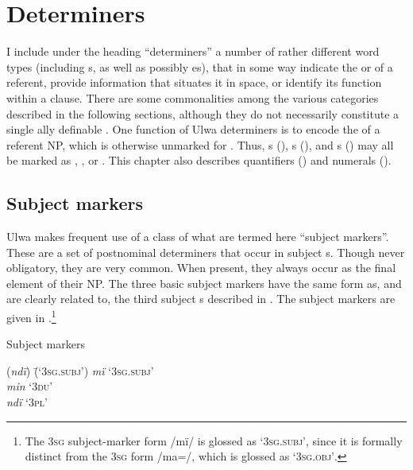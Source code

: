 \chapter{Determiners}\label{sec:7}


I include under the heading “determiners” a number of rather different word types (including s, as well as possibly es), that in some way indicate the  or  of a referent, provide information that situates it in space, or identify its function within a clause. There are some  commonalities among the various categories described in the following sections, although they do not necessarily constitute a single ally definable . One function of Ulwa determiners is to encode the  of a referent NP, which is otherwise unmarked for . Thus, s (), s (), and s () may all be marked as , , or . This chapter also describes quantifiers () and numerals ().


\section{Subject markers}\label{sec:7.1}


Ulwa makes frequent use of a class of what are termed here “subject markers”. These are a set of postnominal determiners that occur in subject s. Though never obligatory, they are very common. When present, they always occur as the final element of their NP. The three basic subject markers have the same form as, and are clearly related to, the third  subject s described in . The subject markers are given in .\footnote{The 3\textsc{sg} subject-marker  form /mï/ is glossed as ‘3\textsc{sg.subj}’, since it is formally distinct from the 3\textsc{sg}  form /ma=/, which is glossed as ‘3\textsc{sg.obj’}.}

\ea%
    \label{ex:det:1}
            Subject markers\\
\begin{tabbing}
{(\textit{ndï})} \= {(‘3\textsc{sg.subj}’)}\kill
{\textit{mï}} \> {‘3\textsc{sg.subj}’}\\
{\textit{min}} \> {‘3\textsc{du}’}\\
{\textit{ndï}} \> {‘3\textsc{pl}’}
\end{tabbing}
\z

